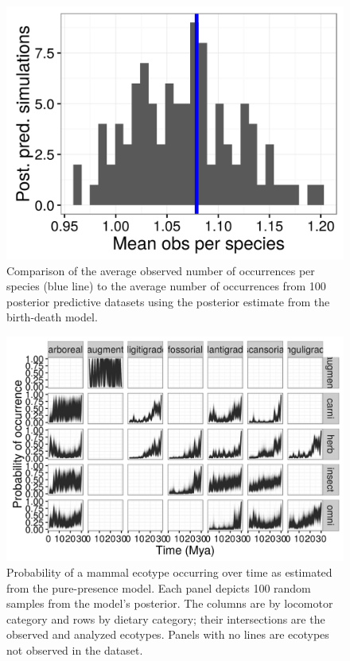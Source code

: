 \documentclass[12pt,letterpaper]{article}
\begin{document}
\begin{figure}[ht]
  \centering
  \includegraphics[width=\textwidth,height=0.4\textheight,keepaspectratio=true]{figure/pred_occ_bd}
  \caption[Posterior predictive check for birth-death model]{Comparison of the average observed number of occurrences per species (blue line) to the average number of occurrences from 100 posterior predictive datasets using the posterior estimate from the birth-death model.}
  \label{fig:ppc_birth_death}
\end{figure}

\begin{figure}[ht]
  \centering
  \includegraphics[width=\textwidth,height=0.8\textheight,keepaspectratio=true]{figure/ecotype_occurrence}
  \caption[Ecotype occurrence probability estimated from the pure-presence model]{Probability of a mammal ecotype occurring over time as estimated from the pure-presence model. Each panel depicts 100 random samples from the model's posterior. The columns are by locomotor category and rows by dietary category; their intersections are the observed and analyzed ecotypes. Panels with no lines are ecotypes not observed in the dataset.}
  \label{fig:eco_occur}
\end{figure}
\end{document}

